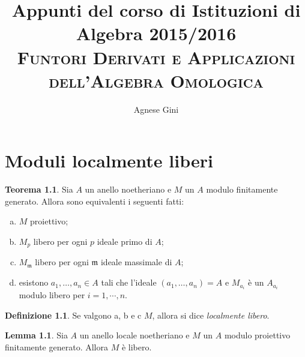 \documentclass[a4paper,11pt,oneside]{book}
\title{\textbf{Appunti del corso di Istituzioni di Algebra 2015/2016}\\ \textsc{Funtori Derivati e Applicazioni dell'Algebra Omologica}}
\author{Agnese Gini}
\newcommand{\m}{\mathfrak{m}}
\theoremstyle{definition}
\newtheorem{de}{Definizione}
\newtheorem{teo}[section]{Teorema}
\newtheorem{lemma}{Lemma}
\begin{document}
\maketitle
\tableofcontents
\chapter{Moduli localmente liberi}
 \begin{teo}\label{teo:loclibero}
  Sia $A$ un anello noetheriano e $M$ un $A$ modulo finitamente generato. Allora sono equivalenti i seguenti fatti:
   \begin{enumerate}[a.]
    \item $M$ proiettivo;
    \item $M_p$ libero per ogni $p$ ideale primo di $A$;
    \item $M_{\m}$ libero per ogni $\m$ ideale massimale di $A$;
    \item esistono $a_1,\dots,a_n\in A$ tali che l'ideale $(a_1,\dots,a_n)=A$ e 
	  $M_{a_i}$ è un $A_{a_i}$ modulo libero per $i=1,\cdots,n$.
   \end{enumerate}
 \end{teo}

 \begin{de}
  Se valgono a, b e c $M$, allora si dice \emph{localmente libero}.
 \end{de}

 \begin{lemma}\label{loc:proiettivoimplicalibero}
  Sia $A$ un anello locale noetheriano e $M$ un $A$ modulo proiettivo finitamente generato. Allora $M$ è libero.
 \end{lemma}
\end{document}

